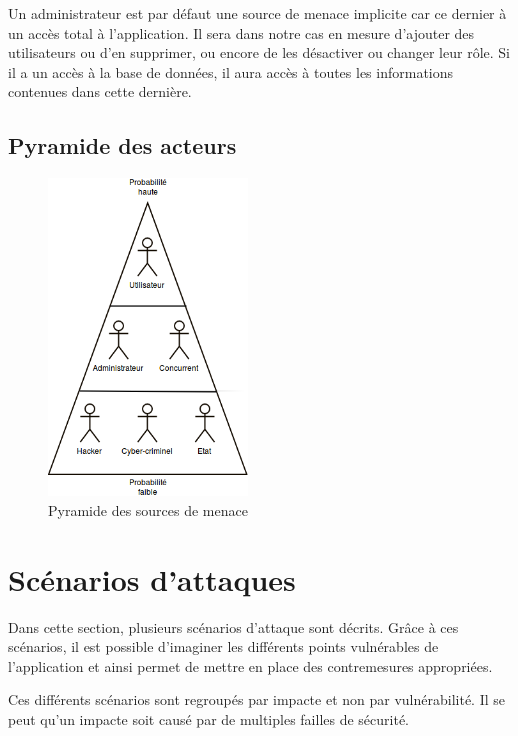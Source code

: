 \documentclass[12pt]{article}
\begin{document}
Un administrateur est par défaut une source de menace implicite car ce dernier à un accès total à l'application. Il sera dans notre cas en mesure d'ajouter des utilisateurs ou d'en supprimer, ou encore de les désactiver ou changer leur rôle. Si il a un accès à la base de données, il aura accès à toutes les informations contenues dans cette dernière.

\subsection{Pyramide des acteurs}

\begin{figure}[h]
 	\center
	\includegraphics[width=200px]{pyramid}
 	\caption{Pyramide des sources de menace} 
 	\label{flux}	
\end{figure}


\newpage
\section{Scénarios d'attaques}

Dans cette section, plusieurs scénarios d'attaque sont décrits. Grâce à ces scénarios, il est possible d'imaginer les différents points vulnérables de l'application et ainsi permet de mettre en place des contremesures appropriées.

Ces différents scénarios sont regroupés par impacte et non par vulnérabilité. Il se peut qu'un impacte soit causé par de multiples failles de sécurité.
\end{document}
